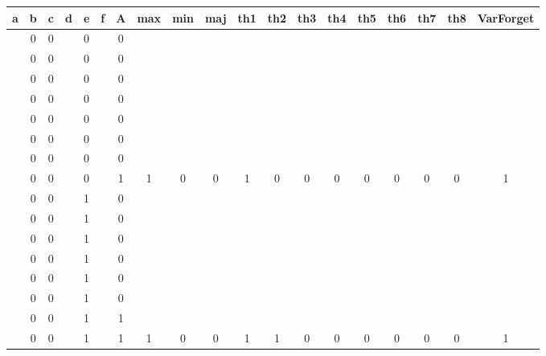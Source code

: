 \begin{table}[!tb]
    \centering
    \begin{tabular}{|c|c|c|c|c|c|c|c|c|c|c|c|c|c|c|c|c|c|c|}
        \hline
        \textbf{a} & \textbf{b} & \textbf{c} & \textbf{d} & \textbf{e} & \textbf{f} & \textbf{A} & \textbf{max} & \textbf{min} & \textbf{maj} & \textbf{th1} & \textbf{th2} & \textbf{th3} & \textbf{th4} & \textbf{th5} & \textbf{th6} & \textbf{th7} & \textbf{th8} & \textbf{VarForget} \\ \hline
        \rowcolor{gray!40}  & 0 & 0 &  & 0 &  & 0 &  &  &  &  &  &  &  &  &  &  &  &  \\ \hline
        \rowcolor{gray!40}  & 0 & 0 &  & 0 &  & 0 &  &  &  &  &  &  &  &  &  &  &  &  \\ \hline
        \rowcolor{gray!40}  & 0 & 0 &  & 0 &  & 0 &  &  &  &  &  &  &  &  &  &  &  &  \\ \hline
        \rowcolor{gray!40}  & 0 & 0 &  & 0 &  & 0 &  &  &  &  &  &  &  &  &  &  &  &  \\ \hline
        \rowcolor{gray!40}  & 0 & 0 &  & 0 &  & 0 &  &  &  &  &  &  &  &  &  &  &  &  \\ \hline
        \rowcolor{gray!40}  & 0 & 0 &  & 0 &  & 0 &  &  &  &  &  &  &  &  &  &  &  &  \\ \hline
        \rowcolor{gray!40}  & 0 & 0 &  & 0 &  & 0 &  &  &  &  &  &  &  &  &  &  &  &  \\ \hline
        \rowcolor{gray!40}  & 0 & 0 &  & 0 &  & 1 & 1 & 0 & 0 & 1 & 0 & 0 & 0 & 0 & 0 & 0 & 0 & 1 \\ \hline
        \rowcolor{blue!40}  & 0 & 0 &  & 1 &  & 0 &  &  &  &  &  &  &  &  &  &  &  &  \\ \hline
        \rowcolor{blue!40}  & 0 & 0 &  & 1 &  & 0 &  &  &  &  &  &  &  &  &  &  &  &  \\ \hline
        \rowcolor{blue!40}  & 0 & 0 &  & 1 &  & 0 &  &  &  &  &  &  &  &  &  &  &  &  \\ \hline
        \rowcolor{blue!40}  & 0 & 0 &  & 1 &  & 0 &  &  &  &  &  &  &  &  &  &  &  &  \\ \hline
        \rowcolor{blue!40}  & 0 & 0 &  & 1 &  & 0 &  &  &  &  &  &  &  &  &  &  &  &  \\ \hline
        \rowcolor{blue!40}  & 0 & 0 &  & 1 &  & 0 &  &  &  &  &  &  &  &  &  &  &  &  \\ \hline
        \rowcolor{blue!40}  & 0 & 0 &  & 1 &  & 1 &  &  &  &  &  &  &  &  &  &  &  &  \\ \hline
        \rowcolor{blue!40}  & 0 & 0 &  & 1 &  & 1 & 1 & 0 & 0 & 1 & 1 & 0 & 0 & 0 & 0 & 0 & 0 & 1 \\ \hline

\end{tabular}
\end{table}
